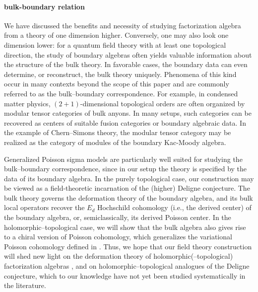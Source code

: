 \documentclass[11pt]{article}
\numberwithin{equation}{section}
\begin{document}
\paragraph{bulk-boundary relation}
We have discussed the benefits and necessity of studying factorization algebra from a theory of one dimension higher. Conversely, one may also look one dimension lower: for a quantum field theory with at least one topological direction, the study of boundary algebras often yields valuable information about the structure of the bulk theory. In favorable cases, the boundary data can even determine, or reconstruct, the bulk theory uniquely. Phenomena of this kind occur in many contexts beyond the scope of this paper and are commonly referred to as the bulk--boundary correspondence. For example, in condensed matter physics, $(2+1)$-dimensional topological orders are often organized by modular tensor categories \cite{turaev2016quantum} of bulk anyons. In many setups, such categories can be recovered as centers of suitable fusion categories or boundary algebraic data. In the example of Chern--Simons theory, the modular tensor category may be realized as the category of modules of the boundary Kac-Moody algebra. 

Generalized Poisson sigma models are particularly well suited for studying the bulk--boundary correspondence, since in our setup the theory is specified by the data of its boundary algebra. In the purely topological case, our construction may be viewed as a field-theoretic incarnation of the (higher) Deligne conjecture. The bulk theory governs the deformation theory of the boundary algebra, and its bulk local operators recover the $E_d$ Hochschild cohomology (i.e., the derived center) of the boundary algebra, or, semiclassically, its derived Poisson center. In the holomorphic--topological case, we will show that the bulk algebra also gives rise to a chiral version of Poisson cohomology, which generalizes the variational Poisson cohomology defined in \cite{de2013variational,bakalov2019operadic}. Thus, we hope that our field theory construction will shed new light on the deformation theory of holomorphic(--topological) factorization algebras \cite{Butson:2026vmn}, and on holomorphic--topological analogues of the Deligne conjecture, which to our knowledge have not yet been studied systematically in the literature.
\end{document}
